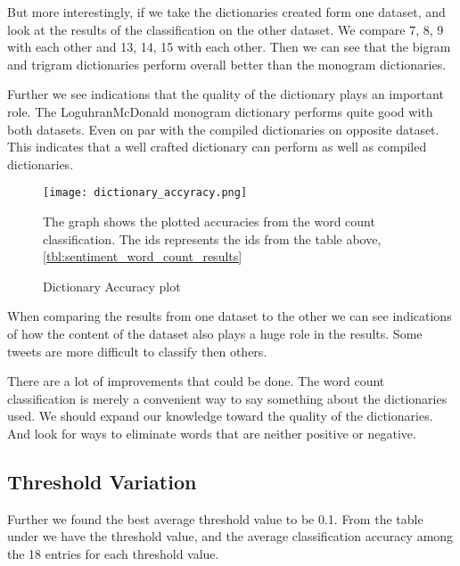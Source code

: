 But more interestingly, if we take the dictionaries created form one dataset,
and look at the results of the classification on the other dataset. We compare
7, 8, 9 with each other and 13, 14, 15 with each other. Then we can see that
the bigram and trigram dictionaries perform overall better than the monogram
dictionaries.

Further we see indications that the quality of the dictionary plays an
important role. The LoguhranMcDonald monogram dictionary performs quite good
with both datasets. Even on par with the compiled dictionaries on opposite
dataset. This indicates that a well crafted dictionary can perform as well
as compiled dictionaries.

\begin{figure}[htb]
    \centering
    \texttt{[image: dictionary\_accyracy.png]}
    \label{fig:dictionary_accyracy}
    \caption{Dictionary Accuracy plot}
The graph shows the plotted accuracies from the word count
classification. The ids represents the ids from the table above,
\ref{tbl:sentiment_word_count_results}
\end{figure}

When comparing the results from one dataset to the other we can see indications
of how the content of the dataset also plays a huge role in the results. Some
tweets are more difficult to classify then others.

There are a lot of improvements that could be done.
The word count classification is merely a convenient way to say something about
the dictionaries used. We should expand our knowledge toward the quality of the
dictionaries. And look for ways to eliminate words that are neither positive or
negative. 

\subsection{Threshold Variation}\label{results:threshold}
Further we found the best average threshold value to be 0.1.
From the table under we have the threshold value, and the average
classification accuracy among the 18 entries for each threshold value.

